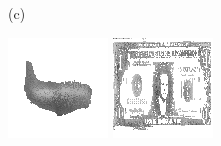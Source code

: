 \documentclass{article}
\begin{document}
\begin{figure}[t]
\begin{minipage}[c]{.21\linewidth}
  \end{minipage}
  \begin{minipage}[c]{.1\linewidth}
    \centering\centerline{(c)}
  \end{minipage}
  \begin{minipage}[c]{.21\linewidth}
    \centering\centerline{\includegraphics[width=\linewidth]{imgs/dennis_cal/airplane/sums/0_1.png}}
  \end{minipage}
  \begin{minipage}[c]{.21\linewidth}
    \centering\centerline{\includegraphics[width=\linewidth]{imgs/dennis_cal/dollar/sums/0_1.png}}

\end{minipage}
\end{figure}
\end{document}
